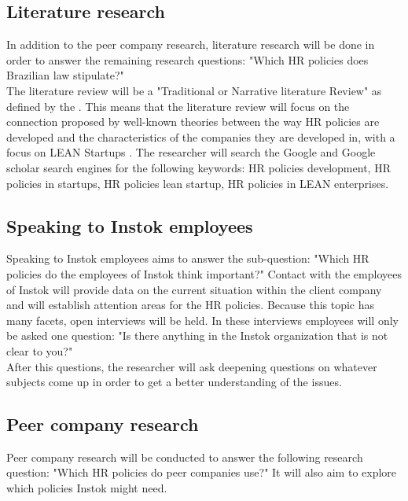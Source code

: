 \documentclass[man]{apa6}
\begin{document}
\subsection{Literature research}
In addition to the peer company research, literature research will be done in order to answer the remaining research questions: "Which HR policies does Brazilian law stipulate?" \\
The literature review will be a "Traditional or Narrative literature Review" as defined by the \cite{TOLEDO2016}. This means that the literature review will focus on the connection proposed by well-known theories between the way HR policies are developed and the characteristics of the companies they are developed in, with a focus on LEAN Startups \parencite{RIES2011}. The researcher will search the Google and Google scholar search engines for the following keywords: HR policies development, HR policies in startups, HR policies lean startup, HR policies in LEAN enterprises.

\subsection{Speaking to Instok employees}
Speaking to Instok employees aims to answer the sub-question: "Which HR policies do the employees of Instok think important?" Contact with the employees of Instok will provide data on the current situation within the client company and will establish attention areas for the HR policies. Because this topic has many facets, open interviews will be held. In these interviews employees will only be asked one question: "Is there anything in the Instok organization that is not clear to you?"\\
After this questions, the researcher will ask deepening questions on whatever subjects come up in order to get a better understanding of the issues.

\subsection{Peer company research}
Peer company research will be conducted to answer the following research question: "Which HR policies do peer companies use?" It will also aim to explore which policies Instok might need.\\
\end{document}
